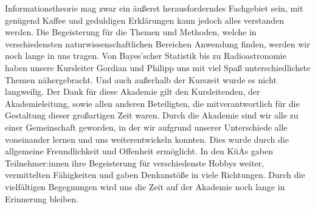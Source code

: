 Informationstheorie mag zwar ein äußerst herausforderndes Fachgebiet sein, mit genügend Kaffee und geduldigen Erklärungen kann jedoch alles verstanden werden. Die Begeisterung für die Themen und Methoden, welche in verschiedensten naturwissenschaftlichen Bereichen Anwendung finden, werden wir noch lange in uns tragen. Von Bayes’scher Statistik bis zu Radioastronomie haben unsere Kursleiter Gordian und Philipp uns mit viel Spaß unterschiedlichste Themen nähergebracht. Und auch außerhalb der Kurszeit wurde es nicht langweilig. Der Dank für diese Akademie gilt den Kursleitenden, der Akademieleitung, sowie allen anderen Beteiligten, die mitverantwortlich für die Gestaltung dieser großartigen Zeit waren. Durch die Akademie sind wir alle zu einer Gemeinschaft geworden, in der wir aufgrund unserer Unterschiede alle voneinander lernen und uns weiterentwickeln konnten. Dies wurde durch die allgemeine Freundlichkeit und Offenheit ermöglicht. In den KüAs gaben Teilnehmer:innen ihre Begeisterung für verschiedenste Hobbys weiter, vermittelten Fähigkeiten und gaben Denkanstöße in viele Richtungen. Durch die vielfältigen Begegnungen wird uns die Zeit auf der Akademie noch lange in Erinnerung bleiben. 
